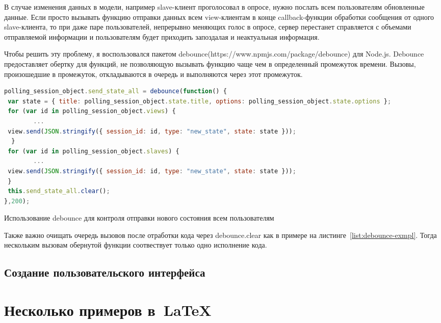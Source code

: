 В случае изменения данных в модели, например slave-клиент проголосовал в опросе, нужно послать всем пользователям обновленные данные. Если просто вызывать функцию отправки данных всем view-клиентам в конце callback-функции обработки сообщения от одного slave-клиента, то при даже паре пользователей, непрерывно меняющих голос в опросе, сервер перестанет справляется с объемами отправляемой информации и пользователям будет приходить запоздалая и неактуальная информация.

Чтобы решить эту проблему, я воспользовался пакетом debounce(https://www.npmjs.com/package/debounce) для Node.js. Debounce предоставляет обертку для функций, не позволяющую вызывать функцию чаще чем в определенный промежуток времени. Вызовы, произошедшие в промежуток, откладываются в очередь и выполняются через этот промежуток.
 \begin{ListingEnv}[H]
	\begin{lstlisting}[language=JavaScript]
polling_session_object.send_state_all = debounce(function() {
 var state = { title: polling_session_object.state.title, options: polling_session_object.state.options };
 for (var id in polling_session_object.views) {
		...
 view.send(JSON.stringify({ session_id: id, type: "new_state", state: state }));
  }
 for (var id in polling_session_object.slaves) {
		...
 view.send(JSON.stringify({ session_id: id, type: "new_state", state: state }));
 }
 this.send_state_all.clear();
},200);
\end{lstlisting}
\caption{Использование debounce для контроля отправки нового состояния всем пользователям}
\label{list:debounce-exmpl}
\end{ListingEnv}      

Также важно очищать очередь вызовов после отработки кода через debounce.clear как в примере на листинге~\ref{list:debounce-exmpl}. Тогда нескольким вызовам обернутой функции соотвествует только одно исполнение кода.

\subsection{Создание пользовательского интерфейса}


\section{Несколько примеров в~\LaTeX{}}
\label{sec:examples}

